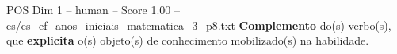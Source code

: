 \begin{textsample}{POS Dim 1 – human – Score 1.00 – es/es\_ef\_anos\_iniciais\_matematica\_3\_p8.txt}  \label{ex:f1_pos_012}
\textbf{Complemento} do(s) verbo(s), que \textbf{explicita} o(s) objeto(s) de conhecimento mobilizado(s) na habilidade.

\end{textsample}

